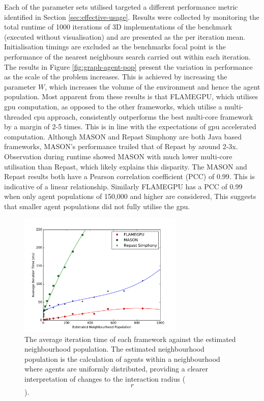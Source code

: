   Each of the parameter sets utilised targeted a different performance metric identified in Section \ref{sec:effective-usage}. Results were collected by monitoring the total runtime of 1000 iterations of 3D implementations of the benchmark (executed without visualisation) and are presented as the per iteration mean. Initialisation timings are excluded as the benchmarks focal point is the performance of the nearest neighbours search carried out within each iteration.
  The results in Figure \ref{fig:graph-agent-pop} present the variation in performance as the scale of the problem increases. This is achieved by increasing the parameter $W$, which increases the volume of the environment and hence the agent population. Most apparent from these results is that FLAMEGPU, which utilises \gls{gpu} computation, as opposed to the other frameworks, which utilise a multi-threaded \gls{cpu} approach, consistently outperforms the best multi-core framework by a margin of 2-5 times. This is in line with the expectations of \gls{gpu} accelerated computation\cite{LK*10}. Although MASON and Repast Simphony are both Java based frameworks, MASON's performance trailed that of Repast by around 2-3x. Observation during runtime showed MASON with much lower multi-core utilisation than Repast, which likely explains this disparity. 
  The MASON and Repast results both have a Pearson correlation coefficient (PCC) \cite{PCC} of 0.99. This is indicative of a linear relationship. Similarly FLAMEGPU has a PCC of 0.99 when only agent populations of 150,000 and higher are considered, This suggests that smaller agent populations did not fully utilise the \gls{gpu}.
  \begin{figure}[tb]
\begin{center}
    \includegraphics[width=0.7\textwidth]{../resources/neighbourscale_graph/graph.pdf}
    \caption{\label{fig:graph-neighbourhood-pop}The average iteration time of each framework against the estimated neighbourhood population. The estimated neighbourhood population is the calculation of agents within a neighbourhood where agents are uniformly distributed, providing a clearer interpretation of changes to the interaction radius ($$r$$). }
\end{center}
\vspace{-1cm}
\end{figure}
  
